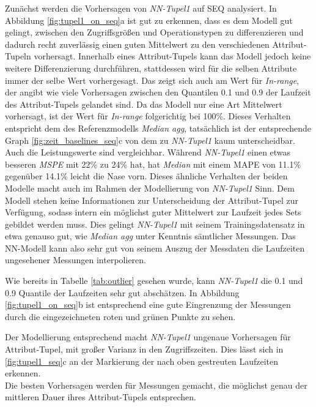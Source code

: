 \documentclass[
	12pt,
	a4paper,
	BCOR10mm,
	DIV14,
	listof=totoc,
	bibliography=totoc,
	headsepline
]{scrreprt}
\begin{document}
Zunächst werden die Vorhersagen von \textit{NN-Tupel1} auf SEQ analysiert.
In Abbildung \ref{fig:tupel1_on_seq}a ist gut zu erkennen, dass es dem Modell gut gelingt, zwischen den Zugriffsgrößen und Operationstypen zu differenzieren und dadurch recht zuverlässig einen guten Mittelwert zu den verschiedenen Attribut-Tupeln vorhersagt.
Innerhalb eines Attribut-Tupels kann das Modell jedoch keine weitere Differenzierung durchführen, stattdessen wird für die selben Attribute immer der selbe Wert vorhergesagt.
Das zeigt sich auch am Wert für \textit{In-range}, der angibt wie viele Vorhersagen zwischen den Quantilen 0.1 und 0.9 der Laufzeit des Attribut-Tupels gelandet sind.
Da das Modell nur eine Art Mittelwert vorhersagt, ist der Wert für \textit{In-range} folgerichtig bei 100\%.
Dieses Verhalten entspricht dem des Referenzmodells \textit{Median agg}, tatsächlich ist der entsprechende Graph \ref{fig:zeit_baselines_seq}c von dem zu \textit{NN-Tupel1} kaum unterscheidbar.
Auch die Leistungswerte sind vergleichbar. Während \textit{NN-Tupel1} einen etwas besseren \textit{MSPE} mit 22\% zu 24\% hat, hat \textit{Median} mit einem MAPE von 11.1\% gegenüber 14.1\% leicht die Nase vorn. 
Dieses ähnliche Verhalten  der beiden Modelle macht auch im Rahmen der Modellierung von \textit{NN-Tupel1} Sinn.
Dem Modell stehen keine Informationen zur Unterscheidung der Attribut-Tupel zur Verfügung, sodass intern ein möglichst guter Mittelwert zur Laufzeit jedes Sets gebildet werden muss. Dies gelingt \textit{NN-Tupel1} mit seinem Trainingsdatensatz in etwa genauso gut, wie \textit{Median agg} unter Kenntnis sämtlicher Messungen. Das NN-Modell kann also sehr gut von seinem Auszug der Messdaten die Laufzeiten ungesehener Messungen interpolieren.\medskip

Wie bereits in Tabelle \ref{tab:outlier} gesehen wurde, kann \textit{NN-Tupel1} die 0.1 und 0.9 Quantile der Laufzeiten sehr gut abschätzen.
In Abbildung \ref{fig:tupel1_on_seq}b ist entsprechend eine gute Eingrenzung der Messungen durch die eingezeichneten roten und grünen Punkte zu sehen.\medskip

Der Modellierung entsprechend macht \textit{NN-Tupel1} ungenaue Vorhersagen für Attribut-Tupel, mit großer Varianz in den Zugriffszeiten. 
Dies lässt sich in \ref{fig:tupel1_seq}c an der Markierung der nach oben gestreuten Laufzeiten erkennen.\\
Die besten Vorhersagen werden für Messungen gemacht, die möglichst genau der mittleren Dauer ihres Attribut-Tupels entsprechen.\medskip
\end{document}
